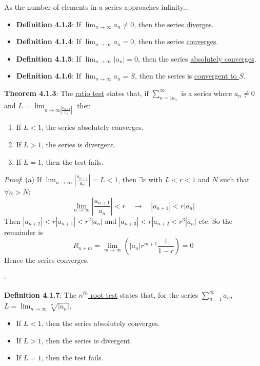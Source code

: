 \documentclass{article}
\newcommand{\separate}[1] {\vspace{#1 pt}\noindent}
\newcommand{\definition}[2]{\textbf{Definition #1}: #2\label{def:#1}}
\newcommand{\proof}[2]{\textit{Proof}: #2 \begin{flushright}\(\square\)\end{flushright}\label{prf:#1}}
\newcommand{\theorem}[3]{\textbf{Theorem #1}: #2 \par\separate{3}\proof{thm:#1}{#3}\label{thm:#1}}
\begin{document}
\separate{7}As the number of elements in a series approaches infinity...
\begin{itemize}
    \item \definition{4.1.3}{If \(\lim_{n\rightarrow\infty}a_n \neq 0\), then the series \underline{diverges}.}
    \item \definition{4.1.4}{If \(\lim_{n\rightarrow\infty}a_n = 0\), then the series \underline{converges}.}
    \item \definition{4.1.5}{If \(\lim_{n\rightarrow\infty}|a_n| = 0\), then the series \underline{absolutely converges}.}
    \item \definition{4.1.6}{If \(\lim_{n\rightarrow\infty}a_n = S\), then the series is \underline{convergent to \(S\)}.}
\end{itemize}

\separate{7}\theorem{4.1.3}{The \underline{ratio test} states that, if \(\sum^\infty_{n=1 a_n}\) is a series where \(a_n \neq 0\) and \(L = \lim_{n\rightarrow\infty \left|\frac{a_{n+1}}{a_n}\right|}\) then
\begin{enumerate}[label=\alph*)]
    \item If \(L < 1\), the series absolutely converges.
    \item If \(L > 1\), the series is divergent.
    \item If \(L =1 \), then the test fails.
\end{enumerate}
}{(a) If \(\lim_{n\rightarrow\infty}\left|\frac{a_{n+1}}{a_n}\right| = L < 1\), then \(\exists r\) with \(L < r < 1\) and \(N\) such that \(\forall n > N\):
\begin{equation}
    \lim_{n\rightarrow\infty}\left|\frac{a_{n+1}}{a_n}\right| < r \quad\rightarrow\quad |a_{n+1}| < r|a_n|
\end{equation}
Then \(|a_{n+2}| < r|a_{n+1}| < r^2|a_n|\) and \(|a_{n+3}| < r|a_{n+2} < r^3|a_n|\) etc. So the remainder is
\begin{equation}
    R_{n+m} = \lim_{m\rightarrow\infty}\left(|a_n|r^{m+1}\frac{1}{1-r}\right) = 0
\end{equation}
Hence the series converges.}

\separate{7}\definition{4.1.7}{The \underline{\(n^{th}\) root test} states that, for the series \(\sum^\infty_{n=1}a_n\), \(L=\lim_{n\rightarrow\infty}\sqrt[n]{|a_n|}\),
\begin{itemize}
    \item If \(L < 1\), then the series absolutely converges.
    \item If \(L > 1\), then the series is divergent.
    \item If \(L = 1\), then the test fails.
\end{itemize}}
\end{document}
